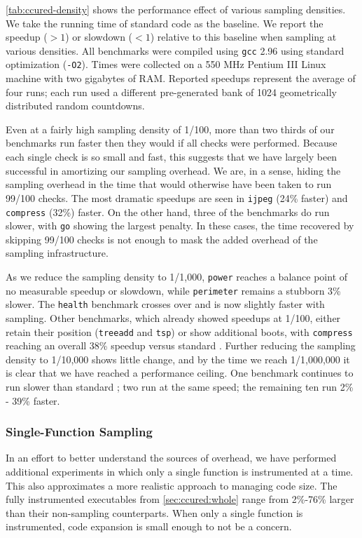 \autoref{tab:ccured-density} shows the performance effect of various
sampling densities.  We take the running time of standard \CCured code
as the baseline.  We report the speedup ($>1$) or slowdown ($<1$)
relative to this baseline when sampling at various densities.  All
benchmarks were compiled using \texttt{gcc} 2.96 using standard
optimization (\texttt{-O2}).  Times were collected on a 550 MHz
Pentium III Linux machine with two gigabytes of RAM.  Reported
speedups represent the average of four runs; each run used a different
pre-generated bank of 1024 geometrically distributed random
countdowns.

Even at a fairly high sampling density of 1/100, more than two thirds
of our benchmarks run faster then they would if all checks were
performed.  Because each single check is so small and fast, this
suggests that we have largely been successful in amortizing our
sampling overhead.  We are, in a sense, hiding the sampling overhead
in the time that would otherwise have been taken to run 99/100 checks.
The most dramatic speedups are seen in \texttt{ijpeg} (24\% faster)
and \texttt{compress} (32\%) faster.  On the other hand, three of the
benchmarks do run slower, with \texttt{go} showing the largest
penalty.  In these cases, the time recovered by skipping 99/100 checks
is not enough to mask the added overhead of the sampling
infrastructure.

As we reduce the sampling density to 1/1,000, \texttt{power} reaches a
balance point of no measurable speedup or slowdown, while
\texttt{perimeter} remains a stubborn 3\% slower.  The \texttt{health}
benchmark crosses over and is now slightly faster with sampling.
Other benchmarks, which already showed speedups at 1/100, either
retain their position (\texttt{treeadd} and \texttt{tsp}) or show
additional boots, with \texttt{compress} reaching an overall 38\%
speedup versus standard \CCured.  Further reducing the sampling
density to 1/10,000 shows little change, and by the time we reach
1/1,000,000 it is clear that we have reached a performance ceiling.
One benchmark continues to run slower than standard \CCured; two run
at the same speed; the remaining ten run 2\% - 39\% faster.

\subsubsection{Single-Function Sampling}

In an effort to better understand the sources of overhead, we have
performed additional experiments in which only a single function is
instrumented at a time.  This also approximates a more realistic
approach to managing code size.  The fully instrumented executables
from \autoref{sec:ccured:whole} range from 2\%-76\% larger than their
non-sampling counterparts.  When only a single function is
instrumented, code expansion is small enough to not be a concern.

